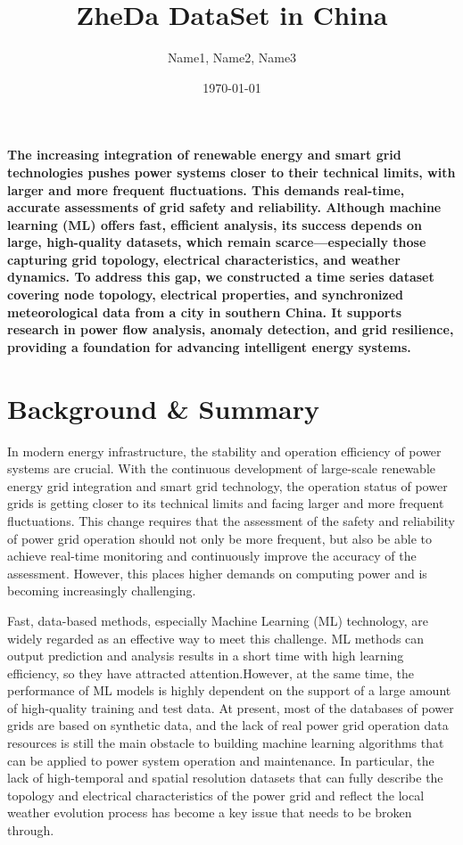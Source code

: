 \documentclass[12pt]{article}
\title{ZheDa DataSet in China}
\author{Name1, Name2, Name3}
\date{\today}
\begin{document}
\maketitle

\textbf{The increasing integration of renewable energy and smart grid technologies pushes power systems closer to their technical limits, with larger and more frequent fluctuations. This demands real-time, accurate assessments of grid safety and reliability. Although machine learning (ML) offers fast, efficient analysis, its success depends on large, high-quality datasets, which remain scarce—especially those capturing grid topology, electrical characteristics, and weather dynamics. To address this gap, we constructed a time series dataset covering node topology, electrical properties, and synchronized meteorological data from a city in southern China. It supports research in power flow analysis, anomaly detection, and grid resilience, providing a foundation for advancing intelligent energy systems.}

\section*{Background \& Summary}

In modern energy infrastructure, the stability and operation efficiency of power systems are crucial.
With the continuous development of large-scale renewable energy grid integration and smart grid technology,
the operation status of power grids is getting closer to its technical limits and facing larger and more frequent fluctuations\cite{gillioz2025large}.
This change requires that the assessment of the safety and reliability of power grid operation should not only be more frequent, 
but also be able to achieve real-time monitoring and continuously improve the accuracy of the assessment. 
However, this places higher demands on computing power and is becoming increasingly challenging.

Fast, data-based methods, especially Machine Learning (ML) technology, are widely regarded as an effective way to meet this challenge.
ML methods can output prediction and analysis results in a short time with high learning efficiency, 
so they have attracted attention\cite{duchesne2020recent,misyris2020physics}.However, at the same time, the performance of ML models is highly dependent 
on the support of a large amount of high-quality training and test data\cite{stiasny2022closing}. At present, most of the databases of 
power grids are based on synthetic data\cite{meinecke2020simbench}, and the lack of real power grid operation data resources is still the main obstacle to building 
machine learning algorithms that can be applied to power system operation and maintenance.
In particular, the lack of high-temporal and spatial resolution datasets that can fully describe the topology and electrical
characteristics of the power grid and reflect the local weather evolution process has become a key issue that needs to be broken through.
\end{document}
